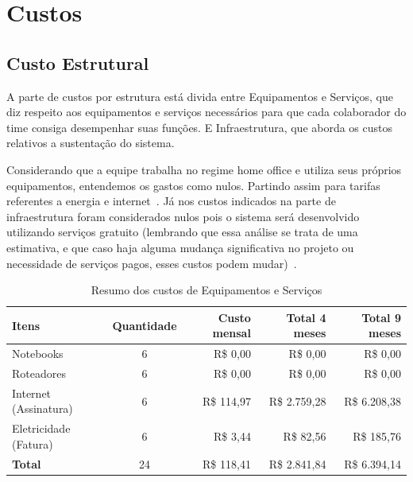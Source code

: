 \documentclass[
	12pt,				%
	openany,			%
	twoside,			%
	a4paper,			%
	english,			%
	french,				%
	spanish,			%
	brazil				%
	]{abntex2}
\begin{document}
\section{Custos}
\subsection{Custo Estrutural}

A parte de custos por estrutura está divida entre Equipamentos e Serviços, que diz respeito aos equipamentos e serviços necessários para que cada colaborador do time consiga desempenhar suas funções. E Infraestrutura, que aborda os custos relativos a sustentação do sistema.

Considerando que a equipe trabalha no regime home office e utiliza seus próprios equipamentos, entendemos os gastos como nulos. Partindo assim para tarifas referentes a energia e internet~\cite{anatel-anexo}.
Já nos custos indicados na parte de infraestrutura foram considerados nulos pois o sistema será desenvolvido utilizando serviços gratuito (lembrando que essa análise se trata de uma estimativa, e que caso haja alguma mudança significativa no projeto ou necessidade de serviços pagos, esses custos podem mudar)~\cite{enel-tarifa}.

\begin{table}[H]
	\centering
	\caption{Resumo dos custos de Equipamentos e Serviços}
	\label{tab:equipamentos-servicos}
	\begin{tabular}{|l|c|r|r|r|}
		\hline
		\textbf{Itens} & \textbf{Quantidade} & \textbf{Custo mensal} & \textbf{Total 4 meses} & \textbf{Total 9 meses} \\
		\hline
		Notebooks & 6 & R\$ 0,00 & R\$ 0,00 & R\$ 0,00 \\
		\hline
		Roteadores & 6 & R\$ 0,00 & R\$ 0,00 & R\$ 0,00 \\
		\hline
		Internet (Assinatura) & 6 & R\$ 114,97 & R\$ 2.759,28 & R\$ 6.208,38 \\
		\hline
		Eletricidade (Fatura) & 6 & R\$ 3,44 & R\$ 82,56 & R\$ 185,76 \\
		\hline
		\textbf{Total} & 24 & R\$ 118,41 & R\$ 2.841,84 & R\$ 6.394,14 \\
		\hline
	\end{tabular}
\end{table}
\end{document}
